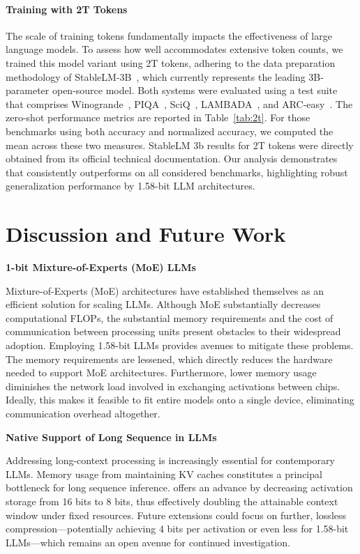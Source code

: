 \paragraph{Training with 2T Tokens}

The scale of training tokens fundamentally impacts the effectiveness of large language models. To assess how well  accommodates extensive token counts, we trained this model variant using 2T tokens, adhering to the data preparation methodology of StableLM-3B~\cite{StableLM-3B-4E1T}, which currently represents the leading 3B-parameter open-source model. Both systems were evaluated using a test suite that comprises Winogrande~\cite{winoGrande}, PIQA~\cite{piqa}, SciQ~\cite{sciq}, LAMBADA~\cite{lambada}, and ARC-easy~\cite{arc}. The zero-shot performance metrics are reported in Table~\ref{tab:2t}. For those benchmarks using both accuracy and normalized accuracy, we computed the mean across these two measures. StableLM 3b results for 2T tokens were directly obtained from its official technical documentation. Our analysis demonstrates that  consistently outperforms on all considered benchmarks, highlighting robust generalization performance by 1.58-bit LLM architectures.

\section{Discussion and Future Work}

\textbf{1-bit Mixture-of-Experts (MoE) LLMs}

Mixture-of-Experts (MoE) architectures have established themselves as an efficient solution for scaling LLMs. Although MoE substantially decreases computational FLOPs, the substantial memory requirements and the cost of communication between processing units present obstacles to their widespread adoption. Employing 1.58-bit LLMs provides avenues to mitigate these problems. The memory requirements are lessened, which directly reduces the hardware needed to support MoE architectures. Furthermore, lower memory usage diminishes the network load involved in exchanging activations between chips. Ideally, this makes it feasible to fit entire models onto a single device, eliminating communication overhead altogether.

\textbf{Native Support of Long Sequence in LLMs}

Addressing long-context processing is increasingly essential for contemporary LLMs. Memory usage from maintaining KV caches constitutes a principal bottleneck for long sequence inference.  offers an advance by decreasing activation storage from 16 bits to 8 bits, thus effectively doubling the attainable context window under fixed resources. Future extensions could focus on further, lossless compression—potentially achieving 4 bits per activation or even less for 1.58-bit LLMs—which remains an open avenue for continued investigation.

